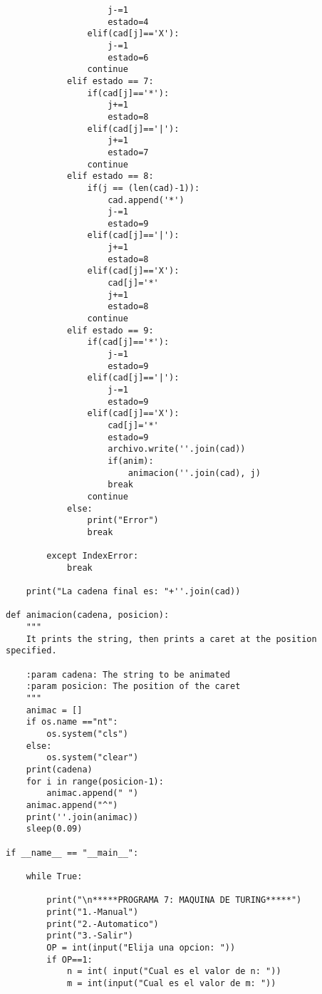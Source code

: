 \documentclass{article}
\begin{document}
\begin{lstlisting}
                    j-=1
                    estado=4
                elif(cad[j]=='X'):
                    j-=1
                    estado=6
                continue
            elif estado == 7:
                if(cad[j]=='*'):
                    j+=1
                    estado=8
                elif(cad[j]=='|'):
                    j+=1
                    estado=7
                continue
            elif estado == 8:
                if(j == (len(cad)-1)):
                    cad.append('*')
                    j-=1
                    estado=9
                elif(cad[j]=='|'):
                    j+=1
                    estado=8
                elif(cad[j]=='X'):
                    cad[j]='*'
                    j+=1
                    estado=8
                continue
            elif estado == 9:
                if(cad[j]=='*'):
                    j-=1
                    estado=9
                elif(cad[j]=='|'):
                    j-=1
                    estado=9
                elif(cad[j]=='X'):
                    cad[j]='*'
                    estado=9
                    archivo.write(''.join(cad))
                    if(anim):
                        animacion(''.join(cad), j)
                    break
                continue
            else:
                print("Error") 
                break  
        
        except IndexError:
            break
        
    print("La cadena final es: "+''.join(cad))
    
def animacion(cadena, posicion):
    """
    It prints the string, then prints a caret at the position specified.
    
    :param cadena: The string to be animated
    :param posicion: The position of the caret
    """
    animac = []
    if os.name =="nt": 
        os.system("cls") 
    else: 
        os.system("clear") 
    print(cadena)
    for i in range(posicion-1):
        animac.append(" ")
    animac.append("^")
    print(''.join(animac))
    sleep(0.09)        
    
if __name__ == "__main__":
    
    while True:
        
        print("\n*****PROGRAMA 7: MAQUINA DE TURING*****")
        print("1.-Manual")
        print("2.-Automatico")
        print("3.-Salir")
        OP = int(input("Elija una opcion: "))    
        if OP==1:
            n = int( input("Cual es el valor de n: "))
            m = int(input("Cual es el valor de m: "))
        

\end{lstlisting}
\end{document}
